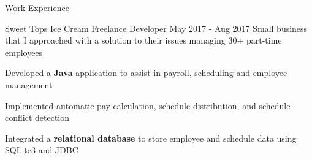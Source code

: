 \documentclass{resume} %
\begin{document}
\begin{rSection}{Work Experience}
    \begin{workexperience}
        {Sweet Tops Ice Cream}
        {Freelance Developer}
        {May 2017 - Aug 2017}
        {Small business that I approached with a solution to their issues managing 30+ part-time employees}
        {
            \item Developed a \textbf{Java} application to assist in payroll, scheduling and employee management
            \item Implemented automatic pay calculation, schedule distribution, and schedule conflict detection
            \item Integrated a \textbf{relational database} to store employee and schedule data using SQLite3 and JDBC
        }
    \end{workexperience}

\end{rSection}


\pagebreak
\end{document}

